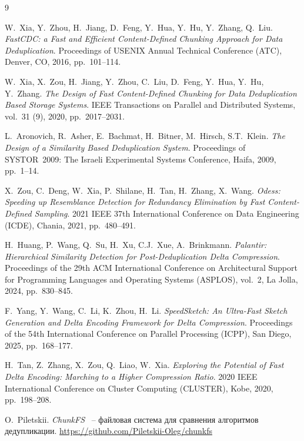 \documentclass[a4paper]{article}
\begin{document}
\begin{thebibliography}{9}

W.\ Xia, Y.\ Zhou, H.\ Jiang, D.\ Feng, Y.\ Hua, Y.\ Hu, Y.\ Zhang, Q.\ Liu.
\textit{FastCDC: a Fast and Efficient Content-Defined Chunking Approach for Data
Deduplication}. Proceedings of USENIX Annual Technical Conference (ATC),
Denver, CO, 2016, pp.~101--114.

W.\ Xia, X.\ Zou, H.\ Jiang, Y.\ Zhou, C.\ Liu, D.\ Feng, Y.\ Hua, Y.\ Hu,
Y.\ Zhang. \textit{The Design of Fast Content-Defined Chunking for Data
Deduplication Based Storage Systems}. IEEE Transactions on Parallel and
Distributed Systems, vol.~31 (9), 2020, pp.~2017--2031.

L.\ Aronovich, R.\ Asher, E.\ Bachmat, H.\ Bitner, M.\ Hirsch, S.T.\ Klein.
\textit{The Design of a Similarity Based Deduplication System}. Proceedings of
SYSTOR~2009: The Israeli Experimental Systems Conference, Haifa, 2009,
pp.~1--14.

X.\ Zou, C.\ Deng, W.\ Xia, P.\ Shilane, H.\ Tan, H.\ Zhang, X.\ Wang.
\textit{Odess: Speeding up Resemblance Detection for Redundancy Elimination by
Fast Content-Defined Sampling}. 2021 IEEE 37th International Conference on
Data Engineering (ICDE), Chania, 2021, pp.~480--491.

H.\ Huang, P.\ Wang, Q.\ Su, H.\ Xu, C.J.\ Xue, A.\ Brinkmann.
\textit{Palantir: Hierarchical Similarity Detection for Post-Deduplication
Delta Compression}. Proceedings of the 29th ACM International Conference on
Architectural Support for Programming Languages and Operating Systems
(ASPLOS), vol.~2, La Jolla, 2024, pp.~830--845.

F.\ Yang, Y.\ Wang, C.\ Li, K.\ Zhou, H.\ Li. \textit{SpeedSketch: An
Ultra-Fast Sketch Generation and Delta Encoding Framework for Delta
Compression}. Proceedings of the 54th International Conference on Parallel
Processing (ICPP), San Diego, 2025, pp.~168--177.

H.\ Tan, Z.\ Zhang, X.\ Zou, Q.\ Liao, W.\ Xia. \textit{Exploring the
Potential of Fast Delta Encoding: Marching to a Higher Compression Ratio}.
2020 IEEE International Conference on Cluster Computing (CLUSTER), Kobe, 2020,
pp.~198--208.

O.\ Piletskii. \textit{ChunkFS} ~-- файловая система для сравнения алгоритмов
дедупликации. \url{https://github.com/Piletskii-Oleg/chunkfs}

\end{thebibliography}
\end{document}
